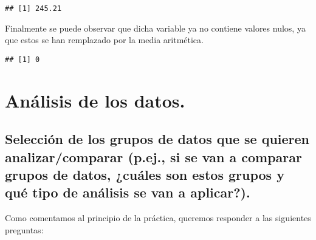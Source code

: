 \documentclass[
]{article}
\newenvironment{Shaded}{\begin{snugshade}}{\end{snugshade}}
\newcommand{\CommentTok}[1]{\textcolor[rgb]{0.56,0.35,0.01}{\textit{#1}}}
\newcommand{\FunctionTok}[1]{\textcolor[rgb]{0.00,0.00,0.00}{#1}}
\newcommand{\NormalTok}[1]{#1}
\newcommand{\OtherTok}[1]{\textcolor[rgb]{0.56,0.35,0.01}{#1}}
\newcommand{\SpecialCharTok}[1]{\textcolor[rgb]{0.00,0.00,0.00}{#1}}
\begin{document}
\begin{verbatim}
## [1] 245.21
\end{verbatim}

\begin{Shaded}
\end{Shaded}

Finalmente se puede observar que dicha variable ya no contiene valores
nulos, ya que estos se han remplazado por la media aritmética.

\begin{Shaded}
\end{Shaded}

\begin{verbatim}
## [1] 0
\end{verbatim}

\hypertarget{anuxe1lisis-de-los-datos.}{%
\section{Análisis de los datos.}\label{anuxe1lisis-de-los-datos.}}

\hypertarget{selecciuxf3n-de-los-grupos-de-datos-que-se-quieren-analizarcomparar-p.ej.-si-se-van-a-comparar-grupos-de-datos-cuuxe1les-son-estos-grupos-y-quuxe9-tipo-de-anuxe1lisis-se-van-a-aplicar.}{%
\subsection{Selección de los grupos de datos que se quieren
analizar/comparar (p.ej., si se van a comparar grupos de datos, ¿cuáles
son estos grupos y qué tipo de análisis se van a
aplicar?).}\label{selecciuxf3n-de-los-grupos-de-datos-que-se-quieren-analizarcomparar-p.ej.-si-se-van-a-comparar-grupos-de-datos-cuuxe1les-son-estos-grupos-y-quuxe9-tipo-de-anuxe1lisis-se-van-a-aplicar.}}

Como comentamos al principio de la práctica, queremos responder a las
siguientes preguntas:
\end{document}

